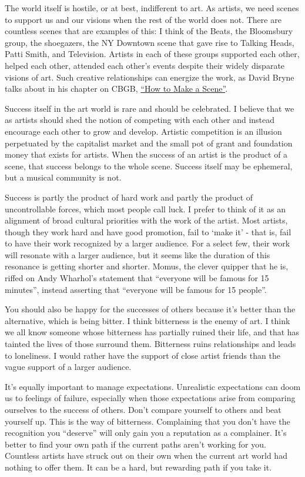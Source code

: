 \documentclass[
]{book}
\begin{document}
The world itself is hostile, or at best, indifferent to art. As artists, we need scenes to support us and our visions when the rest of the world does not. There are countless scenes that are examples of this: I think of the Beats, the Bloomsbury group, the shoegazers, the NY Downtown scene that gave rise to Talking Heads, Patti Smith, and Television. Artists in each of these groups supported each other, helped each other, attended each other's events despite their widely disparate visions of art. Such creative relationships can energize the work, as David Bryne talks about in his chapter on CBGB, \href{http://loud-time.blogspot.com/2012/12/this-aint-no-memoir-how-to-make-scene.html?m=1}{``How to Make a Scene''}.

Success itself in the art world is rare and should be celebrated. I believe that we as artists should shed the notion of competing with each other and instead encourage each other to grow and develop. Artistic competition is an illusion perpetuated by the capitalist market and the small pot of grant and foundation money that exists for artists. When the success of an artist is the product of a scene, that success belongs to the whole scene. Success itself may be ephemeral, but a musical community is not.

Success is partly the product of hard work and partly the product of uncontrollable forces, which most people call luck. I prefer to think of it as an alignment of broad cultural priorities with the work of the artist. Most artists, though they work hard and have good promotion, fail to `make it' - that is, fail to have their work recognized by a larger audience. For a select few, their work will resonate with a larger audience, but it seems like the duration of this resonance is getting shorter and shorter. Momus, the clever quipper that he is, riffed on Andy Wharhol's statement that ``everyone will be famous for 15 minutes'', instead asserting that ``everyone will be famous for 15 people''.

You should also be happy for the successes of others because it's better than the alternative, which is being bitter. I think bitterness is the enemy of art. I think we all know someone whose bitterness has partially ruined their life, and that has tainted the lives of those surround them. Bitterness ruins relationships and leads to loneliness. I would rather have the support of close artist friends than the vague support of a larger audience.

It's equally important to manage expectations. Unrealistic expectations can doom us to feelings of failure, especially when those expectations arise from comparing ourselves to the success of others. Don't compare yourself to others and beat yourself up. This is the way of bitterness. Complaining that you don't have the recognition you ``deserve'' will only gain you a reputation as a complainer. It's better to find your own path if the current paths aren't working for you. Countless artists have struck out on their own when the current art world had nothing to offer them. It can be a hard, but rewarding path if you take it.
\end{document}

